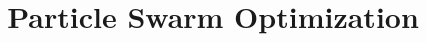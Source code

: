 \title{Particle Swarm Optimization}
\label{chp:particle-swarm-optimization}
\author{}
\institute{}
\maketitle